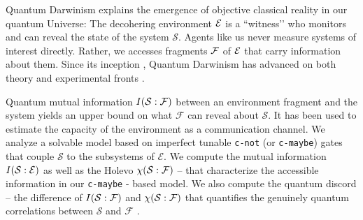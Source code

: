 \documentclass[aps,prl,showpacs,amsmath,amssymb,amsfonts,lengthcheck,twocolumn,longbibliography,superscriptaddress]{revtex4-2}
\newcommand{\cS}        {{\mathcal S}}
\newcommand{\cE}        {{\mathcal E}}
\newcommand{\+}         {\dagger}
\newcommand\cF{{\mathcal F}}
\newcommand{\mc}[1]{\mathcal{#1}}
\begin{document}
\maketitle

Quantum Darwinism \cite{Zurek2000AP,Zurek2003RMP,Ollivier2004PRL,Ollivier2005PRA,Zurek2009NP} explains the emergence of objective classical reality in our quantum Universe: The decohering environment $\cal E$ is a ``witness’’  who monitors and can reveal the state of the system $\cS$. Agents like us never measure systems of interest directly. Rather, we accesses fragments $\cal F$ of $\cal E$ that carry information about them. Since its inception \cite{Zurek2000AP}, Quantum Darwinism has advanced on both theory \cite{Giorgi2015PRA,Balaneskovic2015EPJD,Balaneskovic2016EPJD,Knott2018PRL,Milazzo2019PRA,Campbell2019PRA,Ryan2020,Garcia2020PRR,Lorenzo2020PRR,Qdc1,Qdc2,Qdc3,Qdc4,Qdc5,Qdc6,Qdc7,Qdc8,Qdc9,Qdc10,Qdc11} and experimental fronts \cite{Ciampini2018PRA,Chen2019SB,Unden2019PRL,Garcia2020NPJQI}.

Quantum mutual information $I({\cal S} : {\cal F})$ between an environment fragment and the system yields an upper bound on what $\cF$ can reveal about $\cS$. It has been used to estimate the capacity of the environment as a communication channel. We analyze a solvable model based on imperfect tunable {\tt c-not} (or {\tt c-maybe}) gates that couple $\cS$ to the subsystems of $\cE$. We compute the mutual information $I({\cal S}: {\cal E})$ as well as the Holevo $\chi({\cal S} : {\cal F})$  \cite{Holevo,nielsen2002quantum} -- that characterize the accessible information
in our {\tt c-maybe} - based model. We also compute the quantum discord \cite{Zurek2000AP,Ollivier2001PRL,Henderson2001JPA,Giorda2010PRL,Shi2011JPA,Zwolak2013SR,ZRZ2016SR} -- the difference of $I({\cal S} : {\cal F})$ and $\chi({\cal S} : {\cal F})$ that quantifies the genuinely quantum correlations between $\mc{S}$ and $\mc{F}$ \cite{Brodutch2011JPCS,Adesso2016,Bera2017RPP,discordc1}.

\end{document}
